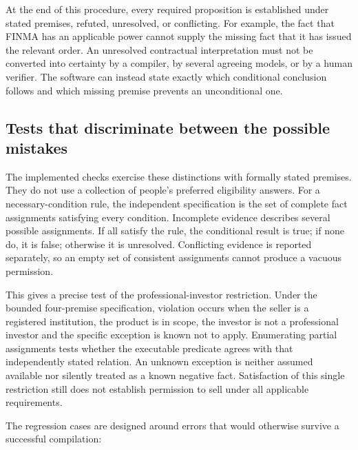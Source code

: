 \documentclass[12pt,a4paper,oneside,openany]{book}
\begin{document}
At the end of this procedure, every required proposition is established under
stated premises, refuted, unresolved, or conflicting. For example, the fact
that FINMA has an applicable power cannot supply the missing fact that it has
issued the relevant order. An unresolved contractual interpretation must not
be converted into certainty by a compiler, by several agreeing models, or by
a human verifier. The software can instead state exactly which conditional
conclusion follows and which missing premise prevents an unconditional one.

\subsection{Tests that discriminate between the possible mistakes}

The implemented checks exercise these distinctions with formally stated
premises. They do not use a collection of people's preferred eligibility
answers. For a necessary-condition rule, the independent specification is the
set of complete fact assignments satisfying every condition. Incomplete
evidence describes several possible assignments. If all satisfy the rule, the
conditional result is true; if none do, it is false; otherwise it is unresolved.
Conflicting evidence is reported separately, so an empty set of consistent
assignments cannot produce a vacuous permission.

This gives a precise test of the professional-investor restriction. Under the
bounded four-premise specification, violation occurs when the seller is a
registered institution, the product is in scope, the investor is not a
professional investor and the specific exception is known not to apply.
Enumerating partial assignments tests whether the executable
predicate agrees with that independently stated relation. An unknown exception
is neither assumed available nor silently treated as a known negative fact.
Satisfaction of this single restriction still does not establish permission to
sell under all applicable requirements.

The regression cases are designed around errors that would otherwise survive
a successful compilation:
\end{document}

